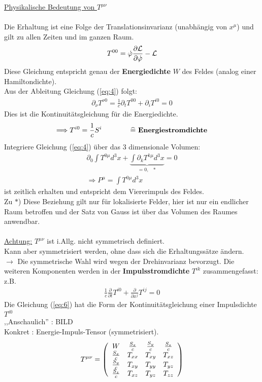 \underline{Physikalische Bedeutung von  $T^ {\mu\nu}$}\\ \\
Die Erhaltung ist eine Folge der Translationsinvarianz (unabhängig von $x^ {\mu}$) und gilt zu allen Zeiten und im ganzen Raum.
\begin{eqnarray*}
T^ {00} = \dot \varphi \frac{\partial \mathcal L}{\partial \dot \varphi} - \mathcal L
\end{eqnarray*}
Diese Gleichung entspricht genau der {\bf Energiedichte} $W$ des Feldes (analog einer Hamiltondichte).\\
Aus der Ableitung Gleichung (\ref{eq:4}) folgt:
\begin{eqnarray*}
\partial_{\nu} T^ {\nu 0} = \frac 1 c  \partial_t T^ {00} + \partial_iT^ {i0} = 0
\end{eqnarray*}
Dies ist die Kontinuitätsgleichung für die Energiedichte.
\begin{eqnarray*} \Longrightarrow T^ {i 0 } = \frac 1 c S^i \qquad \qquad \widehat = \text{     \bf Energiestromdichte}\end{eqnarray*}
Integriere Gleichung (\ref{eq:4}) über das 3 dimensionale Volumen:
\begin{eqnarray*} \partial_0 \int T^ {0\mu}d^ 3x + \underbrace{\int \partial_k T^ {k\mu}d^3x}_{= 0,\ \ \  *}= 0\\
\Longrightarrow P^ {\mu} = \int T^ {0\mu}d^ 3x \end{eqnarray*}
ist zeitlich erhalten und entspricht dem Viererimpuls des Feldes.\\
Zu $*$) Diese Beziehung gilt nur für lokalisierte Felder, hier ist nur ein endlicher Raum betroffen und der Satz von Gauss ist über das Volumen des Raumes anwendbar.\\ \\
\underline{Achtung:} \babsatz $T^ {\mu\nu}$ ist i.Allg. nicht symmetrisch definiert.\\
Kann aber symmetrisiert werden, ohne dass sich die Erhaltungssätze ändern.\\
$\longrightarrow$ Die symmetrische Wahl wird wegen der Drehinvarianz bevorzugt.\eabsatz
Die weiteren Komponenten werden in der {\bf Impulsstromdichte} $T^ {ik}$ zusammengefasst:\\
z.B.
\begin{eqnarray*}\label{eq:6} \frac 1 c\frac{\partial}{\partial t} T^ {i 0} + \frac {\partial}{\partial x^ j}T^ {i j} = 0 \end{eqnarray*}
Die Gleichung (\ref{eq:6}) hat die Form der Kontinuitätsgleichung einer Impulsdichte $T^ {i 0}$\\
,,Anschaulich'' : BILD\\
Konkret : Energie-Impuls-Tensor (symmetrisiert).
\begin{eqnarray*}
T^ {\mu\nu} = \left ( \begin{array}{cccc} W & \frac{S_x}{c}&\frac{S_y}c&\frac{S_z}c\\
\frac{S_x}c&T_{xx}&T_{xy}&T_{xz}\\ \frac{S_y}c&T_{xy}&T_{yy}&T_{yz}\\
\frac{S_z}c&T_{xz}&T_{yz}&T_{zz} \end{array} \right)
\end{eqnarray*}


